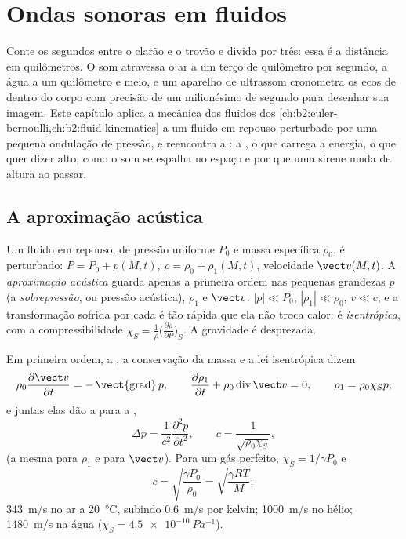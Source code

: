 \chapter{Ondas sonoras em fluidos}\label{ch:b2:sound-waves}

Conte os segundos entre o clarão e o trovão e divida por
três: essa é a distância em quilômetros. O som atravessa o ar a um
terço de quilômetro por segundo, a água a um quilômetro e meio, e
um aparelho de ultrassom cronometra os ecos de dentro do corpo com precisão de um
milionésimo de segundo para desenhar sua imagem. Este capítulo aplica a
mecânica dos fluidos dos \cref{ch:b2:euler-bernoulli,ch:b2:fluid-kinematics}
a um fluido em repouso perturbado por uma pequena ondulação de pressão, e reencontra a
: a , o que carrega a
energia, o que quer dizer alto, como o som se espalha no espaço e por que uma sirene
muda de altura ao passar.

\section{A aproximação acústica}

\begin{definition}\label{def:b2:sound-waves:approximation}
Um fluido em repouso, de pressão uniforme $P_0$ e massa específica $\rho_0$, é
perturbado: $P = P_0 + p(M, t)$, $\rho = \rho_0 + \rho_1(M, t)$, velocidade
$\vect v(M, t)$. A \emph{aproximação acústica} guarda apenas a primeira
ordem nas pequenas grandezas $p$ (a \emph{sobrepressão}, ou pressão
acústica), $\rho_1$ e $\vect v$: $|p| \ll P_0$, $|\rho_1| \ll \rho_0$, $v \ll c$,
e a transformação sofrida por cada  é tão rápida
que ela não troca calor: é \emph{isentrópica}, com a
compressibilidade $\chi_S = \frac1\rho\bigl(\frac{\partial\rho}{\partial P}\bigr)_S$.
A gravidade é desprezada.
\end{definition}

\begin{theorem}\label{thm:b2:sound-waves:equation}
Em primeira ordem, a , a conservação da massa e a lei
isentrópica dizem
\[
\rho_0\frac{\partial\vect v}{\partial t} = -\operatorname{\vect{grad}}p , \qquad
\frac{\partial\rho_1}{\partial t} + \rho_0\operatorname{div}\vect v = 0 , \qquad
\rho_1 = \rho_0\chi_Sp ,
\]
e juntas elas dão a  para a ,
\[
\Delta p = \frac1{c^2}\frac{\partial^2p}{\partial t^2} , \qquad
c = \frac1{\sqrt{\rho_0\chi_S}} ,
\]
(a mesma para $\rho_1$ e para $\vect v$). Para um gás perfeito, $\chi_S =
1/\gamma P_0$ e
\[
c = \sqrt{\frac{\gamma P_0}{\rho_0}} = \sqrt{\frac{\gamma RT}{M}} :
\]
\qty{343}{m/s} no ar a \qty{20}{\degreeCelsius}, subindo \qty{0.6}{m/s}
por kelvin; \qty{1000}{m/s} no hélio; \qty{1480}{m/s} na água ($\chi_S =
\qty{4.5e-10}{Pa^{-1}}$).
\end{theorem}

